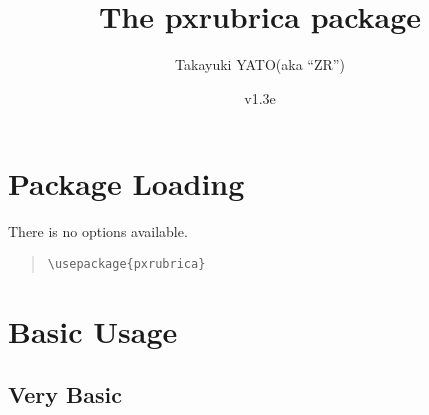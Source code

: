 \documentclass[a4paper]{article}
\newcommand*{\PKN}[1]{\textsf{#1}}
\newcommand*{\myfileversion}{1.3e}
\newcommand*{\myfiledate}{2023/03/01}
\begin{document}
\title{The \PKN{pxrubrica} package}
\author{Takayuki YATO\quad (aka ``ZR'')}
\date{v\myfileversion \quad[\myfiledate]}
\maketitle


\section{Package Loading}

There is no options available.

\begin{quote}\small\begin{verbatim}
\usepackage{pxrubrica}
\end{verbatim}\end{quote}

\section{Basic Usage}

\subsection{Very Basic}
\end{document}
